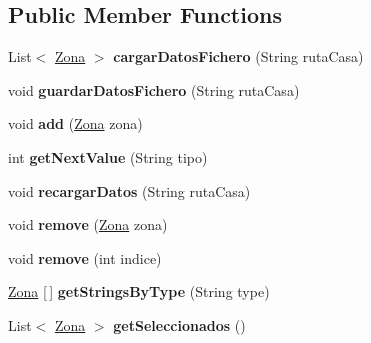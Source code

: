 \subsection*{Public Member Functions}
\begin{DoxyCompactItemize}
\item 
\mbox{\label{classmodelo_1_1_casa_af9274bc27190d87445c1738f9521e1de}} 
List$<$ \mbox{\hyperlink{classmodelo_1_1_zona}{Zona}} $>$ {\bfseries cargar\+Datos\+Fichero} (String ruta\+Casa)
\item 
\mbox{\label{classmodelo_1_1_casa_a504a6d0ee469d24256747979729793ae}} 
void {\bfseries guardar\+Datos\+Fichero} (String ruta\+Casa)
\item 
\mbox{\label{classmodelo_1_1_casa_acc00d762e914de9fb2226b936faa6628}} 
void {\bfseries add} (\mbox{\hyperlink{classmodelo_1_1_zona}{Zona}} zona)
\item 
\mbox{\label{classmodelo_1_1_casa_adb043de5db6f7a315518085206568667}} 
int {\bfseries get\+Next\+Value} (String tipo)
\item 
\mbox{\label{classmodelo_1_1_casa_aa739909f439596b93dfbbd899f0ec740}} 
void {\bfseries recargar\+Datos} (String ruta\+Casa)
\item 
\mbox{\label{classmodelo_1_1_casa_acb5c7d204a097018d4fcb24b24b19537}} 
void {\bfseries remove} (\mbox{\hyperlink{classmodelo_1_1_zona}{Zona}} zona)
\item 
\mbox{\label{classmodelo_1_1_casa_af00a9d3d107d6574ff06bff594c3971e}} 
void {\bfseries remove} (int indice)
\item 
\mbox{\label{classmodelo_1_1_casa_a65e195399c3dac20e34b6201c666e97f}} 
\mbox{\hyperlink{classmodelo_1_1_zona}{Zona}} \mbox{[}$\,$\mbox{]} {\bfseries get\+Strings\+By\+Type} (String type)
\item 
\mbox{\label{classmodelo_1_1_casa_a2f915f8146b2bf9aac77bd76d40a7c3d}} 
List$<$ \mbox{\hyperlink{classmodelo_1_1_zona}{Zona}} $>$ {\bfseries get\+Seleccionados} ()

\end{DoxyCompactItemize}
